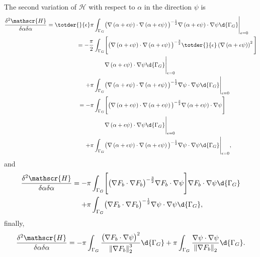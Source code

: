 The second variation of $\mathscr{H}$ with respect to $\alpha$ in the direction $\psi$ is
\small
\begin{align*}
 \frac{\delta^2 \mathscr{H}}{\delta \alpha \delta \alpha}
  = \totder{}{\epsilon} \pi \int_{\Gamma_G} &\big( \nabla \left( \alpha + \epsilon \psi \right) \cdot \nabla \left( \alpha + \epsilon \psi \right) \big)^{-\frac{1}{2}} \nabla \left( \alpha + \epsilon \psi \right) \cdot \nabla \psi \d{\Gamma_G} \Bigg|_{\epsilon = 0} \\
  =- \frac{\pi}{2} \int_{\Gamma_G} &\Bigg[ \big( \nabla \left( \alpha + \epsilon \psi \right) \cdot \nabla \left( \alpha + \epsilon \psi \right) \big)^{-\frac{3}{2}} \totder{}{\epsilon} \left( \nabla \left( \alpha + \epsilon \psi \right) \right)^2 \Bigg]\\
   &\nabla \left( \alpha + \epsilon \psi \right) \cdot \nabla \psi \d{\Gamma_G} \Bigg|_{\epsilon = 0} \\
  + \pi \int_{\Gamma_G} &\big( \nabla \left( \alpha + \epsilon \psi \right) \cdot \nabla \left( \alpha + \epsilon \psi \right) \big)^{-\frac{1}{2}} \nabla \psi \cdot \nabla \psi \d{\Gamma_G} \Bigg|_{\epsilon = 0} \\
  =- \pi \int_{\Gamma_G} &\Bigg[ \big( \nabla \left( \alpha + \epsilon \psi \right) \cdot \nabla \left( \alpha + \epsilon \psi \right) \big)^{-\frac{3}{2}} \nabla \left( \alpha + \epsilon \psi \right) \cdot \nabla \psi \Bigg]\\
   &\nabla \left( \alpha + \epsilon \psi \right) \cdot \nabla \psi \d{\Gamma_G} \Bigg|_{\epsilon = 0} \\
  + \pi \int_{\Gamma_G} &\big( \nabla \left( \alpha + \epsilon \psi \right) \cdot \nabla \left( \alpha + \epsilon \psi \right) \big)^{-\frac{1}{2}} \nabla \psi \cdot \nabla \psi \d{\Gamma_G} \Bigg|_{\epsilon = 0},
\end{align*}
\normalsize
and
\begin{align*}
 \frac{\delta^2 \mathscr{H}}{\delta \alpha \delta \alpha}
  =- \pi \int_{\Gamma_G} &\Bigg[ \big( \nabla F_b \cdot \nabla F_b \big)^{-\frac{3}{2}} \nabla F_b \cdot \nabla \psi \Bigg] \nabla F_b \cdot \nabla \psi \d{\Gamma_G} \\
  + \pi \int_{\Gamma_G} &\big( \nabla F_b \cdot \nabla F_b \big)^{-\frac{1}{2}} \nabla \psi \cdot \nabla \psi \d{\Gamma_G},
\end{align*}
finally,
\begin{align*}
 \frac{\delta^2 \mathscr{H}}{\delta \alpha \delta \alpha}
  =- \pi \int_{\Gamma_G} \frac{\big( \nabla F_b \cdot \nabla \psi \big)^2}{\left\Vert \nabla F_b \right\Vert_2^3} \d{\Gamma_G} 
  + \pi \int_{\Gamma_G} \frac{\nabla \psi \cdot \nabla \psi}{\left\Vert \nabla F_b \right\Vert_2} \d{\Gamma_G}.
\end{align*}


